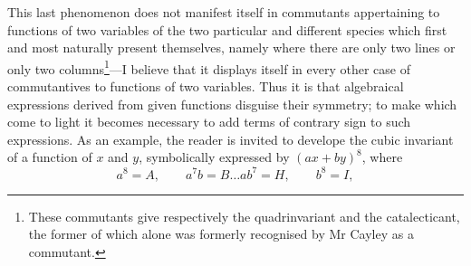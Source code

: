 \documentclass[11pt]{article}
\begin{document}
{{This last phenomenon does not manifest itself in commutants appertaining to functions of two variables of the two particular and different species which first and most naturally present themselves, namely where there are only two lines or only two columns\footnote{These commutants give respectively the quadrinvariant and the catalecticant, the former of which alone was formerly recognised by Mr Cayley as a commutant.}---I believe that it displays itself in every other case of commutantives to functions of two variables. Thus it is that algebraical expressions derived from given functions disguise their symmetry; to make which come to light it becomes necessary to add terms of contrary sign to such expressions. As an example, the reader is invited to develope the cubic invariant of a function of $x$ and $y$, symbolically expressed by $(ax+by)^8$, where
\[
a^8=A,\qquad a^7b=B\ldots ab^7=H,\qquad b^8=I,
\]

}}
\end{document}
